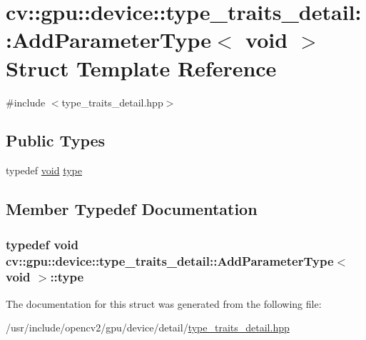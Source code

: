 \hypertarget{structcv_1_1gpu_1_1device_1_1type__traits__detail_1_1AddParameterType_3_01void_01_4}{\section{cv\-:\-:gpu\-:\-:device\-:\-:type\-\_\-traits\-\_\-detail\-:\-:Add\-Parameter\-Type$<$ void $>$ Struct Template Reference}
\label{structcv_1_1gpu_1_1device_1_1type__traits__detail_1_1AddParameterType_3_01void_01_4}
}


{\ttfamily \#include $<$type\-\_\-traits\-\_\-detail.\-hpp$>$}

\subsection*{Public Types}
\begin{DoxyCompactItemize}
\item 
typedef \hyperlink{legacy_8hpp_a8bb47f092d473522721002c86c13b94e}{void} \hyperlink{structcv_1_1gpu_1_1device_1_1type__traits__detail_1_1AddParameterType_3_01void_01_4_a3443be1246a162121d80dbdf6ffff6e5}{type}
\end{DoxyCompactItemize}


\subsection{Member Typedef Documentation}
\hypertarget{structcv_1_1gpu_1_1device_1_1type__traits__detail_1_1AddParameterType_3_01void_01_4_a3443be1246a162121d80dbdf6ffff6e5}{
\subsubsection[{type}]{\setlength{\rightskip}{0pt plus 5cm}typedef {\bf void} {\bf cv\-::gpu\-::device\-::type\-\_\-traits\-\_\-detail\-::\-Add\-Parameter\-Type}$<$ {\bf void} $>$\-::{\bf type}}}\label{structcv_1_1gpu_1_1device_1_1type__traits__detail_1_1AddParameterType_3_01void_01_4_a3443be1246a162121d80dbdf6ffff6e5}


The documentation for this struct was generated from the following file\-:\begin{DoxyCompactItemize}
\item 
/usr/include/opencv2/gpu/device/detail/\hyperlink{type__traits__detail_8hpp}{type\-\_\-traits\-\_\-detail.\-hpp}\end{DoxyCompactItemize}

